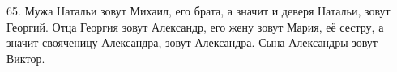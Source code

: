 65. Мужа Натальи зовут Михаил, его брата, а значит и деверя Натальи, зовут Георгий. Отца Георгия зовут Александр, его жену зовут Мария, её сестру, а значит свояченицу Александра, зовут Александра. Сына Александры зовут Виктор.\\
